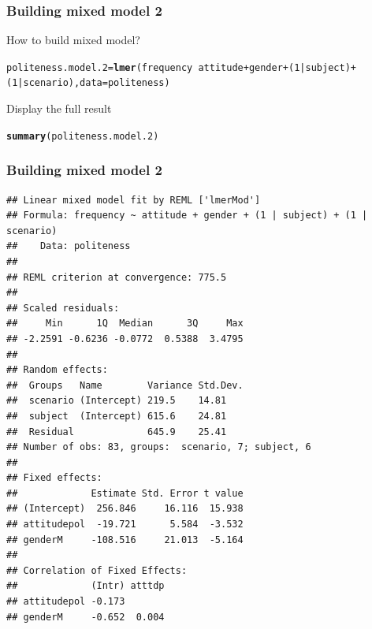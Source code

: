\documentclass[10p]{beamer}\usepackage[]{graphicx}\usepackage[]{color}
\makeatletter
\newcommand{\hlnum}[1]{\textcolor[rgb]{0.686,0.059,0.569}{#1}}%
\newcommand{\hlopt}[1]{\textcolor[rgb]{0,0,0}{#1}}%
\newcommand{\hlstd}[1]{\textcolor[rgb]{0.345,0.345,0.345}{#1}}%
\newcommand{\hlkwb}[1]{\textcolor[rgb]{0.69,0.353,0.396}{#1}}%
\newcommand{\hlkwc}[1]{\textcolor[rgb]{0.333,0.667,0.333}{#1}}%
\newcommand{\hlkwd}[1]{\textcolor[rgb]{0.737,0.353,0.396}{\textbf{#1}}}%
\newenvironment{kframe}{%
 \def\at@end@of@kframe{}%
 \ifinner\ifhmode%
  \def\at@end@of@kframe{\end{minipage}}%
  \begin{minipage}{\columnwidth}%
 \fi\fi%
 \def\FrameCommand##1{\hskip\@totalleftmargin \hskip-\fboxsep
 \colorbox{shadecolor}{##1}\hskip-\fboxsep
     \hskip-\linewidth \hskip-\@totalleftmargin \hskip\columnwidth}%
 \MakeFramed {\advance\hsize-\width
   \@totalleftmargin\z@ \linewidth\hsize
   \@setminipage}}%
 {\par\unskip\endMakeFramed%
 \at@end@of@kframe}
\newenvironment{knitrout}{}{} %
\makeatother
\begin{document}
\begin{frame}[fragile]
\frametitle{Building mixed model 2}
How to build mixed model?
\begin{knitrout}\scriptsize
{}\color{fgcolor}\begin{kframe}
\begin{alltt}
\hlstd{politeness.model.2} \hlkwb{=} \hlkwd{lmer}\hlstd{(frequency} \hlopt{~} \hlstd{attitude} \hlopt{+} \hlstd{gender} \hlopt{+} \hlstd{(}\hlnum{1}\hlopt{|}\hlstd{subject)} \hlopt{+} \hlstd{(}\hlnum{1}\hlopt{|}\hlstd{scenario),} \hlkwc{data}\hlstd{=politeness)}
\end{alltt}
\end{kframe}
\end{knitrout}

Display the full result
\begin{knitrout}\scriptsize
{}\color{fgcolor}\begin{kframe}
\begin{alltt}
\hlkwd{summary}\hlstd{(politeness.model.2)}
\end{alltt}
\end{kframe}
\end{knitrout}

\end{frame}

\begin{frame}[fragile]
\frametitle{Building mixed model 2}
\begin{knitrout}\scriptsize
{}\color{fgcolor}\begin{kframe}
\begin{verbatim}
## Linear mixed model fit by REML ['lmerMod']
## Formula: frequency ~ attitude + gender + (1 | subject) + (1 | scenario)
##    Data: politeness
## 
## REML criterion at convergence: 775.5
## 
## Scaled residuals: 
##     Min      1Q  Median      3Q     Max 
## -2.2591 -0.6236 -0.0772  0.5388  3.4795 
## 
## Random effects:
##  Groups   Name        Variance Std.Dev.
##  scenario (Intercept) 219.5    14.81   
##  subject  (Intercept) 615.6    24.81   
##  Residual             645.9    25.41   
## Number of obs: 83, groups:  scenario, 7; subject, 6
## 
## Fixed effects:
##             Estimate Std. Error t value
## (Intercept)  256.846     16.116  15.938
## attitudepol  -19.721      5.584  -3.532
## genderM     -108.516     21.013  -5.164
## 
## Correlation of Fixed Effects:
##             (Intr) atttdp
## attitudepol -0.173       
## genderM     -0.652  0.004
\end{verbatim}
\end{kframe}
\end{knitrout}
\end{frame}
\end{document}
